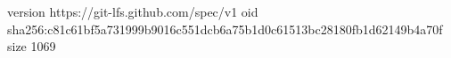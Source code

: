 version https://git-lfs.github.com/spec/v1
oid sha256:c81c61bf5a731999b9016c551dcb6a75b1d0c61513bc28180fb1d62149b4a70f
size 1069
